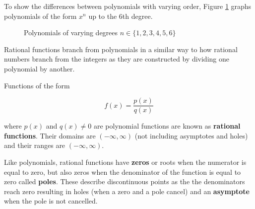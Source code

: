 \begin{example} To show the differences between polynomials with varying order, Figure \ref{fig:polynomials} graphs polynomials of the form $x^n$ up to the $6$th degree.

    \begin{figure}[!ht]
        \centering
        \caption{Polynomials of varying degrees $n \in \{1,2,3,4,5,6\}$}
        \label{fig:polynomials}
    \end{figure}
\end{example}

Rational functions branch from polynomials in a similar way to how rational numbers branch from the integers as they are constructed by dividing one polynomial by another.

\begin{definition}
    Functions of the form

    \begin{equation}
        f(x) = \frac{p(x)}{q(x)}
    \end{equation}

    \noindent where $p(x)$ and $q(x) \neq 0$ are polynomial functions are known as \textbf{rational functions}. Their domains are $(-\infty,\infty)$ (not including asymptotes and holes) and their ranges are $(-\infty,\infty)$.
\end{definition}

Like polynomials, rational functions have \textbf{zeros} or roots when the numerator is equal to zero, but also zeros when the denominator of the function is equal to zero called \textbf{poles}. These describe discontinuous points as the the denominators reach zero resulting in holes (when a zero and a pole cancel) and an \textbf{asymptote} when the pole is not cancelled.

